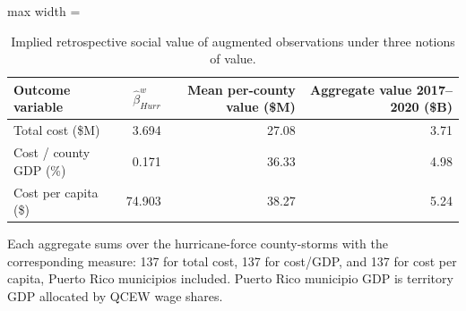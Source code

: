 \begin{table}

\caption{Implied retrospective social value of augmented observations under three notions of value. \label{tab:implied_value}}
\centering
\begin{adjustbox}{max width = \textwidth}
\begin{threeparttable}
\begin{tabular}[t]{lrrr}
\toprule
Outcome variable & $\hat{\beta}^w_{Hurr}$ & Mean per-county value (\$M) & Aggregate value 2017--2020 (\$B)\\
\midrule
Total cost (\$M) & 3.694 & 27.08 & 3.71\\
Cost / county GDP (\%) & 0.171 & 36.33 & 4.98\\
Cost per capita (\$) & 74.903 & 38.27 & 5.24\\
\bottomrule
\end{tabular}
\begin{tablenotes}
\small
\item Each aggregate sums over the hurricane-force county-storms with the corresponding measure: 137 for total cost, 137 for cost/GDP, and 137 for cost per capita, Puerto Rico municipios included. Puerto Rico municipio GDP is territory GDP allocated by QCEW wage shares.
\end{tablenotes}
\end{threeparttable}
\end{adjustbox}
\end{table}

